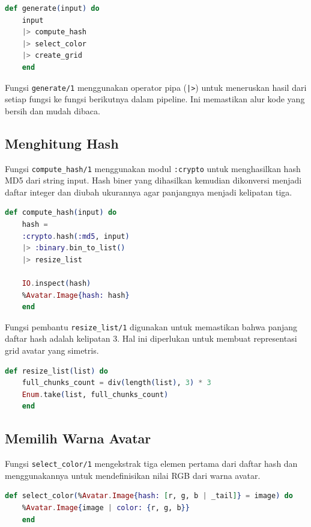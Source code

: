 \begin{lstlisting}[language=Elixir, caption={Fungsi utama untuk pembuatan avatar}]
	def generate(input) do
	input
	|> compute_hash
	|> select_color
	|> create_grid
	end
\end{lstlisting}

Fungsi \texttt{generate/1} menggunakan operator pipa (\texttt{|>}) untuk meneruskan hasil dari setiap fungsi ke fungsi berikutnya dalam pipeline. Ini memastikan alur kode yang bersih dan mudah dibaca.

\subsection{Menghitung Hash}
Fungsi \texttt{compute\_hash/1} menggunakan modul \texttt{:crypto} untuk menghasilkan hash MD5 dari string input. Hash biner yang dihasilkan kemudian dikonversi menjadi daftar integer dan diubah ukurannya agar panjangnya menjadi kelipatan tiga.

\begin{lstlisting}[language=Elixir, caption={Menghitung hash dari string input}]
	def compute_hash(input) do
	hash =
	:crypto.hash(:md5, input)
	|> :binary.bin_to_list()
	|> resize_list
	
	IO.inspect(hash)
	%Avatar.Image{hash: hash}
	end
\end{lstlisting}

Fungsi pembantu \texttt{resize\_list/1} digunakan untuk memastikan bahwa panjang daftar hash adalah kelipatan 3. Hal ini diperlukan untuk membuat representasi grid avatar yang simetris.

\begin{lstlisting}[language=Elixir, caption={Mengubah ukuran daftar hash}]
	def resize_list(list) do
	full_chunks_count = div(length(list), 3) * 3
	Enum.take(list, full_chunks_count)
	end
\end{lstlisting}

\subsection{Memilih Warna Avatar}
Fungsi \texttt{select\_color/1} mengekstrak tiga elemen pertama dari daftar hash dan menggunakannya untuk mendefinisikan nilai RGB dari warna avatar.

\begin{lstlisting}[language=Elixir, caption={Memilih warna avatar dari hash}]
	def select_color(%Avatar.Image{hash: [r, g, b | _tail]} = image) do
	%Avatar.Image{image | color: {r, g, b}}
	end
\end{lstlisting}

